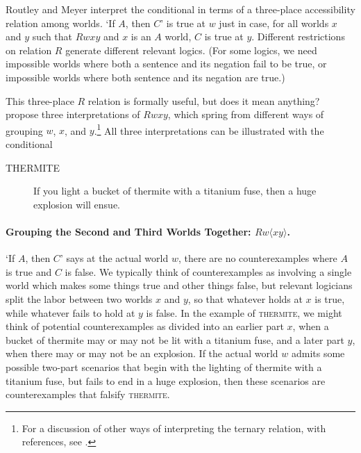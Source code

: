 Routley and Meyer interpret the conditional in terms of a three-place accessibility relation among worlds.  `If $A$, then $C$' is true at $w$ just in case, for all worlds $x$ and $y$ such that $Rwxy$ and $x$ is an $A$ world, $C$ is true at $y$.  Different restrictions on relation $R$ generate different relevant logics.  (For some logics, we need impossible worlds where both a sentence and its negation fail to be true, or impossible worlds where both sentence and its negation are true.)

This three-place $R$ relation is formally useful, but does it mean anything?  \citet{Beall2012-BEAOTT-3} propose three interpretations of $Rwxy$, which spring from different ways of grouping $w$, $x$, and $y$.\footnote{For a discussion of other ways of interpreting the ternary relation, with references, see \citet{Jago2013-JAGRWI}.}  All three interpretations can be illustrated with the conditional
\begin{description}
\item[THERMITE] If you light a bucket of thermite with a titanium fuse, then a huge explosion will ensue.
\end{description}

\paragraph{Grouping the Second and Third Worlds Together: $Rw \langle xy \rangle$.} `If $A$, then $C$' says at the actual world $w$, there are no counterexamples where $A$ is true and $C$ is false.  We typically think of counterexamples as involving a single world which makes some things true and other things false, but relevant logicians split the labor between two worlds $x$ and $y$, so that whatever holds at $x$ is true, while whatever fails to hold at $y$ is false. In the example of \textsc{thermite}, we might think of potential counterexamples as divided into an earlier part $x$, when a bucket of thermite may or may not be lit with a titanium fuse, and a later part $y$, when there may or may not be an explosion.  If the actual world $w$ admits some possible two-part scenarios that begin with the lighting of thermite with a titanium fuse, but fails to end in a huge explosion, then these scenarios are counterexamples that falsify \textsc{thermite}.

